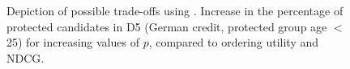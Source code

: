 \begin{figure}[t!]
	\centering
	\vspace{-2mm}
	\caption{Depiction of possible trade-offs using \algoFAIR. Increase in the percentage of protected candidates in D5 (German credit, protected group age $<$ 25) for increasing values of $p$, compared to %
		ordering utility and NDCG.}
	\vspace{-\baselineskip}
	\label{fig:results-moving-p}
\end{figure}
